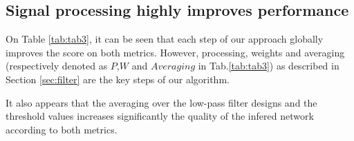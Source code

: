 \documentclass[wcp]{jmlr}
\begin{document}


\subsection*{Signal processing highly improves performance}

On Table \ref{tab:tab3}, it can be seen that each step of our approach globally
improves the score on both metrics. However, processing, weights and averaging
(respectively denoted as $P$,$W$ and $Averaging$ in Tab.\ref{tab:tab3}) as
described in Section \ref{sec:filter} are the key steps of our algorithm.

It also appears that the averaging over the low-pass filter designs and the
threshold values increases significantly the quality of the infered network
according to both metrics.
\end{document}
